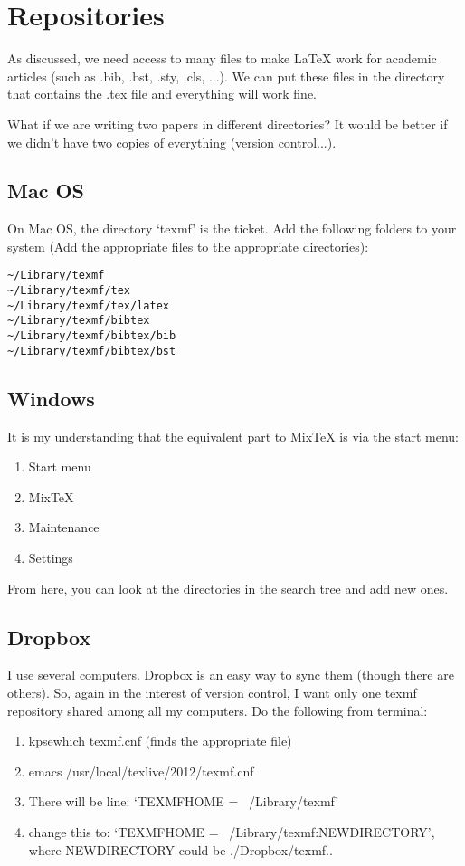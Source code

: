 \documentclass{article}
\begin{document}
\section{Repositories}
As discussed, we need access to many files to make \LaTeX{} work for academic articles (such as .bib, .bst, .sty, .cls, ...).  We can
put these files in the directory that contains the .tex file and everything will work fine.  

What if we are writing two papers in different directories?  It would be better if we didn't have two copies of everything (version control...).
\subsection{Mac OS}

On Mac OS, the directory `texmf' is the ticket.  Add the following folders to your system (Add the appropriate files to the appropriate directories):

\begin{verbatim}
~/Library/texmf
~/Library/texmf/tex
~/Library/texmf/tex/latex
~/Library/texmf/bibtex
~/Library/texmf/bibtex/bib
~/Library/texmf/bibtex/bst
\end{verbatim}

\subsection{Windows}
It is my understanding that the equivalent part to MixTeX is via the start menu:
\begin{enumerate}
\item Start menu
\item MixTeX
\item Maintenance
\item Settings
\end{enumerate}
From here, you can look at the directories in the search tree and add new ones.

\subsection{Dropbox}
I use several computers.  Dropbox is an easy way to sync them (though there are others).  So, again in the interest of version control, I want only one texmf repository shared among all my computers. Do the following from terminal:
\begin{enumerate}
\item kpsewhich texmf.cnf (finds the appropriate file)
\item emacs /usr/local/texlive/2012/texmf.cnf 
\item There will be line: `TEXMFHOME = ~/Library/texmf'
\item change this to: `TEXMFHOME = ~/Library/texmf:NEWDIRECTORY', where NEWDIRECTORY could be ./Dropbox/texmf..
\end{enumerate}
\end{document}
